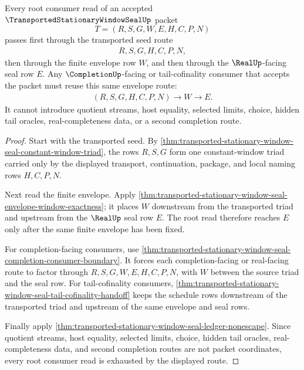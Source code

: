 \begin{theorem}
\label{thm:transported-stationary-window-seal-root-envelope-exhaustion}
Every root consumer read of an accepted $\TransportedStationaryWindowSealUp$ packet
$$
T=(R,S,G,W,E,H,C,P,N)
$$
passes first through the transported seed route
$$
\begin{aligned}
  R,S,G,H,C,P,N,
\end{aligned}
$$
then through the finite envelope row $W$, and then through the $\RealUp$-facing seal row $E$. Any $\CompletionUp$-facing or tail-cofinality consumer that accepts the packet must reuse this same envelope route:
$$
\begin{aligned}
  (R,S,G,H,C,P,N) \longrightarrow W \longrightarrow E .
\end{aligned}
$$
It cannot introduce quotient streams, host equality, selected limits, choice, hidden tail oracles, real-completeness data, or a second completion route.
\end{theorem}
\begin{proof}
Start with the transported seed. By \autoref{thm:transported-stationary-window-seal-constant-window-triad}, the rows $R,S,G$ form one constant-window triad carried only by the displayed transport, continuation, package, and local naming rows $H,C,P,N$.

Next read the finite envelope. Apply \autoref{thm:transported-stationary-window-seal-envelope-window-exactness}; it places $W$ downstream from the transported triad and upstream from the $\RealUp$ seal row $E$. The root read therefore reaches $E$ only after the same finite envelope has been fixed.

For completion-facing consumers, use \autoref{thm:transported-stationary-window-seal-completion-consumer-boundary}. It forces each completion-facing or real-facing route to factor through $R,S,G,W,E,H,C,P,N$, with $W$ between the source triad and the seal row. For tail-cofinality consumers, \autoref{thm:transported-stationary-window-seal-tail-cofinality-handoff} keeps the schedule rows downstream of the transported triad and upstream of the same envelope and seal rows.

Finally apply \autoref{thm:transported-stationary-window-seal-ledger-nonescape}. Since quotient streams, host equality, selected limits, choice, hidden tail oracles, real-completeness data, and second completion routes are not packet coordinates, every root consumer read is exhausted by the displayed route.
\end{proof}


